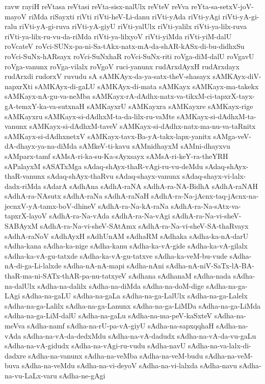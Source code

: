 {ravw
rayiH
reVtasa
reVtasi
reVta-sisx-nalUlx
reVteV
reVva
reYta-sa-setxV-joV-mayoV
riMda
riSayxti
riVti
riVti-heV-Li-danu
riVti-yAda
riVti-yAgi
riVti-yA-gi-ralu
riVti-yA-gi-ruva
riVti-yA-giyU
riVti-yalUlx
riVti-yalilx
riVti-ya-lilx-ruva
riVti-ya-lilx-ru-vu-da-riMda
riVti-ya-lilxyoV
riVti-yiMda
riVti-yiM-dalU
roVcateV
roVci-SUNx-pa-ni-Sa-tAkx-natx-mA-da-shAR-kASx-di-bu-didhxSu
roVci-SuNx-hARsayx
roVci-SuNxhaR
roVci-SuNx-riti
roVga-diM-dalU
roVgavU
roVga-vanunx
roVga-vilalx
roVgoV
ruci-yanunx
rudArxdAyxH
rudArxdayx
rudArxdi
rudorxV
ruvudu
sA
sAMKAyx-da-ya-satx-theV-shasayx
sAMKAyx-diV-napxrXti
sAMKAyx-di-gaLU
sAMKAyx-di-mata
sAMKayx
sAMKayx-ma-takekx
sAMKayx-nA-gu-va-neMba
sAMKayx-rA-dAdhx-natx-va-tikxM-ci-tapxrX-tayx-gA-temxY-ka-va-sutxnaH
sAMKayxrU
sAMKayxra
sAMKayxre
sAMKayx-rige
sAMKayxru
sAMKayx-si-dAdhxM-ta-da-lilx-ru-vaMte
sAMKayx-si-dAdhxM-ta-vanunx
sAMKayx-si-dAdhxM-taveV
sAMKayx-si-dAdhx-natx-ma-nu-va-taRnitx
sAMKayx-si-dAdhxnetxV
sAMKayx-tavx-Ba-yA-takx-lapx-yanitx
sAMga-veV-dA-dhayx-ya-na-diMda
sAMkeV-ti-kavu
sAMnidhayxM
sAMni-dhayxvu
sAMparx-tamf
sAMsA-ri-ka-su-Ka-sAyxsayx
sAMsA-ri-keY-ra-theYRH
sAPalayxM
sASATxMga
sAdaq-shAyx-thaR-vAgi-ru-vu-deMdu
sAdaq-shAyx-thaR-vanunx
sAdaq-shAyx-thaRvu
sAdaq-shayx-vanunx
sAdaq-shayx-vi-lalx-dadx-riMda
sAdarA
sAdhAna
sAdhA-raNA
sAdhA-ra-NA-BidhA
sAdhA-raNAH
sAdhA-ra-NAsutx
sAdhA-raNa
sAdhA-raNaH
sAdhA-ra-Na-jAcnx-taq-jAcnx-na-jecnxV-yA-tamx-boV-dhineV
sAdhA-ra-Na-kA-raNa
sAdhA-ra-Na-sAtx-va-tapxrX-layoV
sAdhA-ra-Na-vAda
sAdhA-ra-Na-vAgi
sAdhA-ra-Na-vi-sheV-SABAyxM
sAdhA-ra-Na-vi-sheV-SAtAmx
sAdhA-ra-Na-vi-sheV-SA-thaRvayx
sAdhA-raNoV
sAdhAyxH
sAdhUnAM
sAdhaRM
sAdhaka
sAdha-ka-nA-darU
sAdha-kana
sAdha-ka-nige
sAdha-kanu
sAdha-ka-vA-gide
sAdha-ka-vA-gilalx
sAdha-ka-vA-gu-tatxde
sAdha-ka-vA-gu-tatxve
sAdha-ka-veM-bu-vude
sAdha-nA-di-ga-Li-lalxde
sAdha-nA-nA-mapi
sAdha-nAni
sAdha-nA-niV-SaTx-lA-BA-thaR-ma-ni-SATx-thAR-pa-nu-tatxyeV
sAdhana
sAdhanaM
sAdha-nada
sAdha-na-dalUlx
sAdha-na-dalilx
sAdha-na-diMda
sAdha-na-doM-dige
sAdha-na-ga-LAgi
sAdha-na-gaLU
sAdha-na-gaLa
sAdha-na-ga-LalUlx
sAdha-na-ga-Lalelx
sAdha-na-ga-Lalilx
sAdha-na-ga-Lanunx
sAdha-na-ga-LiMDa
sAdha-na-ga-LiMda
sAdha-na-ga-LiM-dalU
sAdha-na-gaLu
sAdha-na-ma-peV-kaSxteV
sAdha-na-meVva
sAdha-namf
sAdha-na-rU-pa-vA-giyU
sAdha-na-sapxqqhaH
sAdha-na-vAda
sAdha-na-vA-da-dedxMdu
sAdha-na-vA-dadudx
sAdha-na-vA-da-vu-gaLu
sAdha-na-vA-gidudx
sAdha-na-vAgi-ru-vudu
sAdha-navU
sAdha-na-va-lalx-di-dadxre
sAdha-na-vanunx
sAdha-na-veMba
sAdha-na-veM-budu
sAdha-na-veM-buva
sAdha-na-veMdu
sAdha-na-vi-deyoV
sAdha-na-vi-lalxda
sAdha-navu
sAdha-na-vu-LaLx-varu
sAdha-ne-gAgi
}
